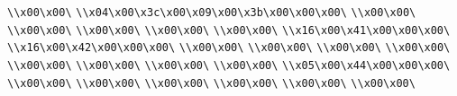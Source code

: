 \verb|\\x00\x00\|\newline
\verb|\\x04\x00\x3c\x00\x09\x00\x3b\x00\x00\x00\|\newline
\verb|\\x00\x00\|\newline
\verb|\\x00\x00\|\newline
\verb|\\x00\x00\|\newline
\verb|\\x00\x00\|\newline
\verb|\\x00\x00\|\newline
\verb|\\x16\x00\x41\x00\x00\x00\|\newline
\verb|\\x16\x00\x42\x00\x00\x00\|\newline
\verb|\\x00\x00\|\newline
\verb|\\x00\x00\|\newline
\verb|\\x00\x00\|\newline
\verb|\\x00\x00\|\newline
\verb|\\x00\x00\|\newline
\verb|\\x00\x00\|\newline
\verb|\\x00\x00\|\newline
\verb|\\x00\x00\|\newline
\verb|\\x05\x00\x44\x00\x00\x00\|\newline
\verb|\\x00\x00\|\newline
\verb|\\x00\x00\|\newline
\verb|\\x00\x00\|\newline
\verb|\\x00\x00\|\newline
\verb|\\x00\x00\|\newline
\verb|\\x00\x00\|\newline

